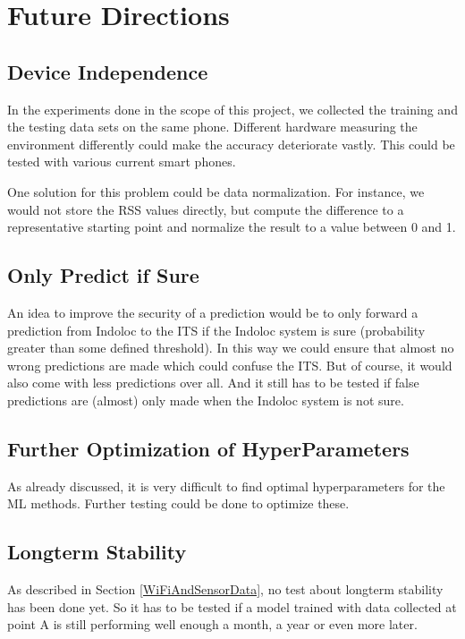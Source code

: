 
\section{Future Directions}

\subsection{Device Independence}
In the experiments done in the scope of this project, we collected the training and the testing data sets on the same phone. Different hardware measuring the environment differently could make the accuracy deteriorate vastly. This could be tested with various current smart phones.

One solution for this problem could be data normalization. For instance, we would not store the RSS values directly, but compute the difference to a representative starting point and normalize the result to a value between 0 and 1. 

\subsection{Only Predict if Sure}
An idea to improve the security of a prediction would be to only forward a prediction from Indoloc to the ITS if the Indoloc system is sure (probability greater than some defined threshold). In this way we could ensure that almost no wrong predictions are made which could confuse the ITS. But of course, it would also come with less predictions over all. And it still has to be tested if false predictions are (almost) only made when the Indoloc system is not sure.


\subsection{Further Optimization of HyperParameters}
As already discussed, it is very difficult to find optimal hyperparameters for the ML methods. Further testing could be done to optimize these.


\subsection{Longterm Stability}
As described in Section \ref{WiFiAndSensorData}, no test about longterm stability has been done yet. So it has to be tested if a model trained with data collected at point A is still performing well enough a month, a year or even more later. 

